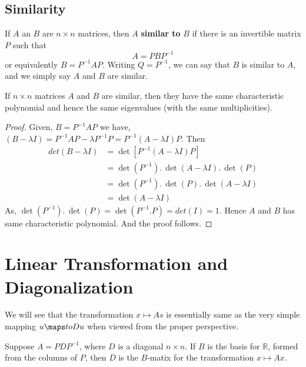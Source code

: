 \documentclass[aima104_lecturenotes_ku.tex]{subfiles}
\begin{document}
\subsection{Similarity}
If $A$ an $B$ are $n \times n$ matrices, then $A$ \textbf{similar to} $B$ if there is an invertible matrix $P$ such that $$A = PBP^{-1}$$ or equivalently $B=P^{-1}AP$. Writing $Q=P^{-1}$, we can say that $B$ is similar to $A$, and we simply say $A$ and $B$ are similar.
\begin{theorem}
  If $n \times n$ matrices $A$ and $B$ are similar, then they have the same characteristic polynomial and hence the same eigenvalues (with the same multiplicities).
\end{theorem}
\begin{proof}
 \hspace{1cm} Given, $B=P^{-1}AP$ we have, $(B-\lambda I) = P^{-1}AP - \lambda P^{-1}P = P^{-1}(A- \lambda I) P$. Then
    \begin{align*}
      det(B-\lambda I) &= \det[P^{-1}(A- \lambda I) P] \\
                       &= \det(P^{-1}).\, \det(A- \lambda I).\, \det(P) \\
                       &= \det(P^{-1}).\, \det(P). \, \det(A- \lambda I) \\
                       &= \det(A- \lambda I)
    \end{align*}
  As, $\det(P^{-1}).\, \det(P) = \det(P^{-1}.P)=det(I) = 1$. Hence $A$ and $B$ has same characteristic polynomial. And the proof follows.
\end{proof}

\section{Linear Transformation and Diagonalization}
We will see that the transformation $x \mapsto As$ is essentially same as the very simple mapping $u \maps to Du$ when viewed from the proper perspective.
\begin{theorem}
  Suppose $A = PDP^{-1}$, where $D$ is a diagonal $n \times n$. If $B$ is the basis for $\mathbb{R}$, formed from the columns of $P$, then $D$ is the $B$-matix for the transformation $x \mapsto Ax$.
\end{theorem}
\end{document}
